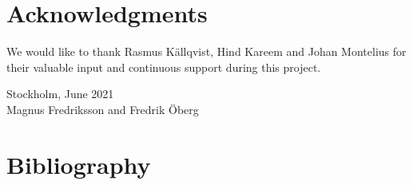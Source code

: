 \documentclass{article}
\newcommand{\acknowlegmentssignature}{
  \begin{flushleft}
    Stockholm, June 2021\\
    Magnus Fredriksson
    and Fredrik Öberg \\
  \end{flushleft}
\cleardoublepage
}
\begin{document}
\hspace{0pt}
\vspace{0.27\textheight}

 \section*{Acknowledgments }
  We would like to thank Rasmus Källqvist, Hind Kareem and Johan Montelius for their valuable input and continuous support during this project. 

\acknowlegmentssignature

\vfill
\hspace{0pt}




\tableofcontents
{}
\newpage
{}














\section{Bibliography}
\printbibliography


\end{document}
